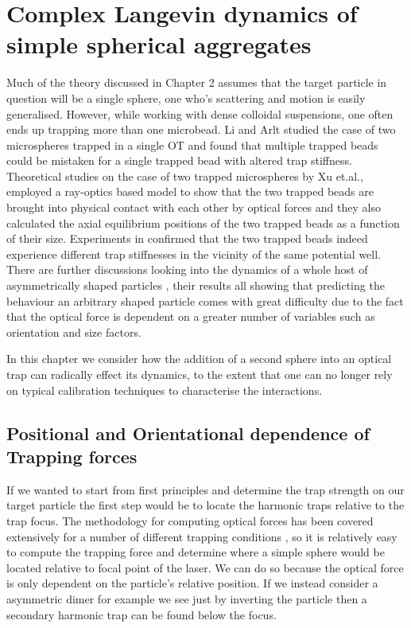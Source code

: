 \documentclass[a4paper,oneside,11pt]{book}
\begin{document}
\chapter{Complex Langevin dynamics of simple spherical aggregates}
Much of the theory discussed in Chapter 2 assumes that the target particle in question will be a single sphere, one who's scattering and motion is easily generalised. However, while working with dense colloidal suspensions, one often ends up trapping more than one microbead. Li and Arlt \cite{Li2008} studied the case of two microspheres trapped in a single OT and found that multiple trapped beads could be mistaken for a single trapped bead with altered trap stiffness. Theoretical studies on the case of two trapped microspheres by Xu et.al., \cite{Xu2005} employed a ray-optics based model to show that the two trapped beads are brought into physical contact with each other by optical forces and they also calculated the axial equilibrium positions of the two trapped beads as a function of their size. Experiments in \cite{Praveen2016} confirmed that the two trapped beads indeed experience different trap stiffnesses in the vicinity of the same potential well. There are further discussions looking into the dynamics of a whole host of asymmetrically shaped particles \cite{Loudet2014, ShengHua2005, Chetana2022}, their results all showing that predicting the behaviour an arbitrary shaped particle comes with great difficulty due to the fact that the optical force is dependent on a greater number of variables such as orientation and size factors.

In this chapter we consider how the addition of a second sphere into an optical trap can radically effect its dynamics, to the extent that one can no longer rely on typical calibration techniques to characterise the interactions.

\section{Positional and Orientational dependence of Trapping forces}
If we wanted to start from first principles and determine the trap strength on our target particle the first step would be to locate the harmonic traps relative to the trap focus. The methodology for computing optical forces has been covered extensively for a number of different trapping conditions \cite{RanhaNeves2019}, so it is relatively easy to compute the trapping force and determine where a simple sphere would be located relative to focal point of the laser. We can do so because the optical force is only dependent on the particle's relative position. If we instead consider a asymmetric dimer for example we see just by inverting the particle then a secondary harmonic trap can be found below the focus.
\end{document}
